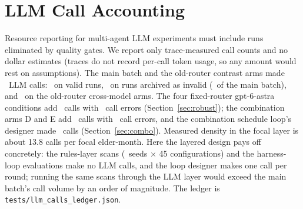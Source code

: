 \documentclass[10pt,twocolumn]{article}
\begin{document}
\section{LLM Call Accounting}\label{sec:cost}
Resource reporting for multi-agent LLM experiments must include runs eliminated by quality gates. We report only trace-measured call counts and no dollar estimates (traces do not record per-call token usage, so any amount would rest on assumptions). The main batch and the old-router contrast arms made \TotalCalls\ LLM calls: \CallsValid\ on valid runs, \CallsWasted\ on runs archived as invalid (\WasteShare\ of the main batch), and \CallsModelCompare\ on the old-router cross-model arms. The four fixed-router gpt-6-astra conditions add \CallsAstraRouter\ calls with \ErrorsAstraRouter\ call errors (Section~\ref{sec:robust}); the combination arms D and E add \CallsAstraCombo\ calls with \ErrorsAstraCombo\ call errors, and the combination schedule loop's designer made \CallsHarnessCombo\ calls (Section~\ref{sec:combo}). Measured density in the focal layer is about 13.8 calls per focal elder-month. Here the layered design pays off concretely: the rules-layer scans (\TimingSeeds\ seeds $\times$ 45 configurations) and the harness-loop evaluations make no LLM calls, and the loop designer makes one call per round; running the same scans through the LLM layer would exceed the main batch's call volume by an order of magnitude. The ledger is \texttt{tests/llm\_calls\_ledger.json}.
\end{document}
